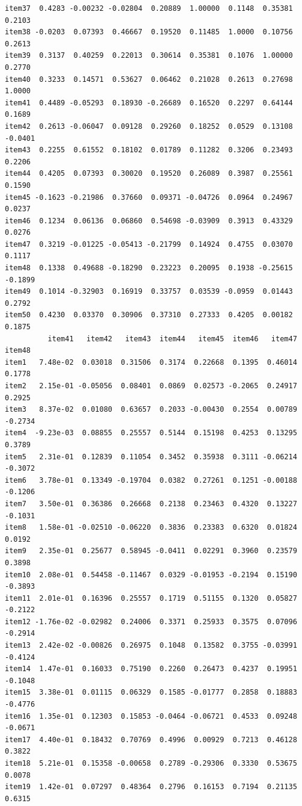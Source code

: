 \documentclass[
  a4paper,
]{ltjsbook}
\begin{document}
\begin{verbatim}
item37  0.4283 -0.00232 -0.02804  0.20889  1.00000  0.1148  0.35381  0.2103
item38 -0.0203  0.07393  0.46667  0.19520  0.11485  1.0000  0.10756  0.2613
item39  0.3137  0.40259  0.22013  0.30614  0.35381  0.1076  1.00000  0.2770
item40  0.3233  0.14571  0.53627  0.06462  0.21028  0.2613  0.27698  1.0000
item41  0.4489 -0.05293  0.18930 -0.26689  0.16520  0.2297  0.64144  0.1689
item42  0.2613 -0.06047  0.09128  0.29260  0.18252  0.0529  0.13108 -0.0401
item43  0.2255  0.61552  0.18102  0.01789  0.11282  0.3206  0.23493  0.2206
item44  0.4205  0.07393  0.30020  0.19520  0.26089  0.3987  0.25561  0.1590
item45 -0.1623 -0.21986  0.37660  0.09371 -0.04726  0.0964  0.24967  0.0237
item46  0.1234  0.06136  0.06860  0.54698 -0.03909  0.3913  0.43329  0.0276
item47  0.3219 -0.01225 -0.05413 -0.21799  0.14924  0.4755  0.03070  0.1117
item48  0.1338  0.49688 -0.18290  0.23223  0.20095  0.1938 -0.25615 -0.1899
item49  0.1014 -0.32903  0.16919  0.33757  0.03539 -0.0959  0.01443  0.2792
item50  0.4230  0.03370  0.30906  0.37310  0.27333  0.4205  0.00182  0.1875
          item41   item42   item43  item44   item45  item46   item47  item48
item1   7.48e-02  0.03018  0.31506  0.3174  0.22668  0.1395  0.46014  0.1778
item2   2.15e-01 -0.05056  0.08401  0.0869  0.02573 -0.2065  0.24917  0.2925
item3   8.37e-02  0.01080  0.63657  0.2033 -0.00430  0.2554  0.00789 -0.2734
item4  -9.23e-03  0.08855  0.25557  0.5144  0.15198  0.4253  0.13295  0.3789
item5   2.31e-01  0.12839  0.11054  0.3452  0.35938  0.3111 -0.06214 -0.3072
item6   3.78e-01  0.13349 -0.19704  0.0382  0.27261  0.1251 -0.00188 -0.1206
item7   3.50e-01  0.36386  0.26668  0.2138  0.23463  0.4320  0.13227 -0.1031
item8   1.58e-01 -0.02510 -0.06220  0.3836  0.23383  0.6320  0.01824  0.0192
item9   2.35e-01  0.25677  0.58945 -0.0411  0.02291  0.3960  0.23579  0.3898
item10  2.08e-01  0.54458 -0.11467  0.0329 -0.01953 -0.2194  0.15190 -0.3893
item11  2.01e-01  0.16396  0.25557  0.1719  0.51155  0.1320  0.05827 -0.2122
item12 -1.76e-02 -0.02982  0.24006  0.3371  0.25933  0.3575  0.07096 -0.2914
item13  2.42e-02 -0.00826  0.26975  0.1048  0.13582  0.3755 -0.03991 -0.4124
item14  1.47e-01  0.16033  0.75190  0.2260  0.26473  0.4237  0.19951 -0.1048
item15  3.38e-01  0.01115  0.06329  0.1585 -0.01777  0.2858  0.18883 -0.4776
item16  1.35e-01  0.12303  0.15853 -0.0464 -0.06721  0.4533  0.09248 -0.0671
item17  4.40e-01  0.18432  0.70769  0.4996  0.00929  0.7213  0.46128  0.3822
item18  5.21e-01  0.15358 -0.00658  0.2789 -0.29306  0.3330  0.53675  0.0078
item19  1.42e-01  0.07297  0.48364  0.2796  0.16153  0.7194  0.21135  0.6315

\end{verbatim}
\end{document}

